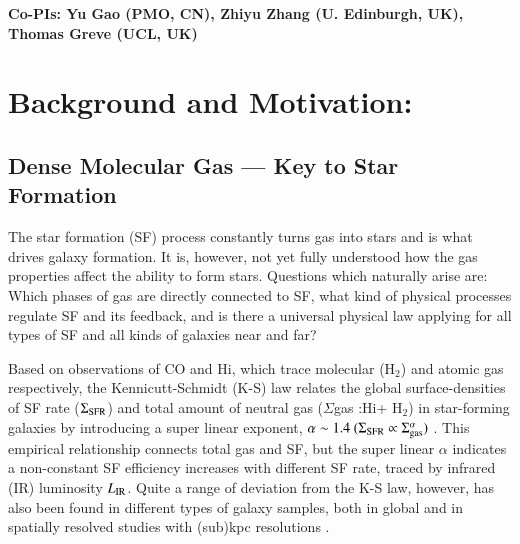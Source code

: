 \documentclass[legal,11pt]{article}
\def\HI{H{\sc i}}
\def\Htwo{H$_2$}
\def\LIR     {$L_{\rm IR}$}
\def\Htwo       {H$_2$}
\begin{document}
\begin{table}[htbp]
\begin{threeparttable}[b]
\begin{tabular}{lcclcc}
\hline
\end{tabular}
 
\begin{tablenotes}
{\bf Co-PIs: Yu Gao (PMO, CN), Zhiyu Zhang (U. Edinburgh, UK), Thomas Greve (UCL, UK)}\\
\end{tablenotes}
\end{threeparttable}

\end{table}



\clearpage
\justify
\medskip


\section{Background and Motivation:}

\subsection{Dense Molecular Gas --- Key to Star Formation }


The star formation (SF) process constantly turns gas into stars and is what
drives galaxy formation. It is, however, not yet fully understood how the gas
properties affect the ability to form stars. Questions which naturally arise
are: Which phases of gas are directly connected to SF, what kind of physical
processes regulate SF and its feedback, and is there a universal physical law
applying for all types of SF and all kinds of galaxies near and far?   


Based on observations of CO and \HI, which trace molecular (\Htwo) and atomic
gas respectively, the Kennicutt-Schmidt (K-S) law relates the global
surface-densities of SF rate ($\Sigma_{\rm SFR}$) and total amount of neutral
gas ($\Sigma$gas :\HI + \Htwo) in star-forming galaxies by introducing a super
linear exponent, $\alpha \sim 1.4 ~ (\Sigma_{\rm SFR} \propto \Sigma_{\rm
gas}^\alpha)$ \citep{Kennicutt2012}. This empirical relationship connects total
gas and SF, but the super linear $\alpha$ indicates a non-constant SF
efficiency increases with  different SF rate, traced by infrared (IR)
luminosity \LIR. Quite a range of deviation from the K-S law, however, has also
been found in different types of galaxy samples, both in global and in
spatially resolved studies with (sub)kpc resolutions
\citep[e.g.,][]{Kennicutt2012,Bigiel2008}.  
\end{document}
